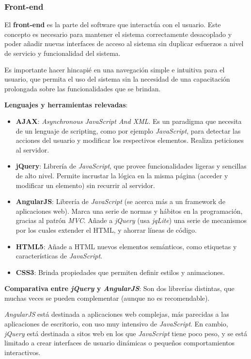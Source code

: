\subsubsection{Front-end}
El \textbf{front-end} es la parte del software que interactúa con el usuario.
Este concepto es necesario para mantener el sistema correctamente desacoplado y poder añadir nuevas interfaces de acceso al sistema sin duplicar esfuerzos a nivel de servicio y funcionalidad del sistema.

Es importante hacer hincapié en una navegación simple e intuitiva para el usuario, que permita el uso del sistema sin la necesidad de una capacitación prolongada sobre las funcionalidades que se brindan.


\textbf{Lenguajes y herramientas relevadas}:
\begin{itemize}
\item \textbf{AJAX}: 
\textit{Asynchronous JavaScript And XML}.
Es un paradigma que necesita de un lenguaje de scripting, como por ejemplo \textit{JavaScript}, para detectar las acciones del usuario y modificar los respectivos elementos.
Realiza peticiones al servidor. 

\item \textbf{jQuery}:
Librería de \textit{JavaScript}, que provee funcionalidades ligeras y sencillas de alto nivel.
Permite incrustar la lógica en la misma página (acceder y modificar un elemento) sin recurrir al servidor.

\item \textbf{AngularJS}:
Librería de \textit{JavaScript} (se acerca más a un framework de aplicaciones web).
Marca una serie de normas y hábitos en la programación, gracias al patrón \textit{MVC}.
Añade a \textit{jQuery} (usa \textit{jqLite}) una serie de mecanismos por los cuales extender el HTML, y ahorrar líneas de código.

\item \textbf{HTML5}:
Añade a HTML nuevos elementos semánticos, como etiquetas y características de \textit{JavaScript}.

\item \textbf{CSS3}:
Brinda propiedades que permiten definir estilos y animaciones.
\end{itemize}

\textbf{Comparativa entre \textit{jQuery} y \textit{AngularJS}}:
Son dos librerías distintas, que muchas veces se pueden complementar (aunque no es recomendable).

\textit{AngularJS} está destinada a aplicaciones web complejas, más parecidas a las aplicaciones de escritorio, con uso muy intensivo de \textit{JavaScript}.
En cambio, \textit{jQuery} está destinada a sitos web en los que \textit{JavaScript} tiene poco peso, y se está limitado a crear interfaces de usuario dinámicas o pequeños comportamientos interactivos.

